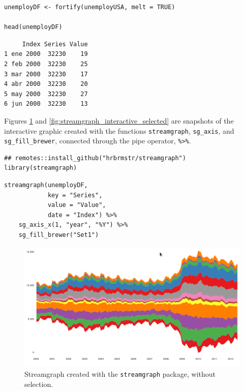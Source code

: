 \documentclass[smallroyalvopaper]{memoir}
\begin{document}

\lstset{language=r,label= ,caption= ,captionpos=b,numbers=none}
\begin{lstlisting}
unemployDF <- fortify(unemployUSA, melt = TRUE)

head(unemployDF)
\end{lstlisting}

\begin{verbatim}
     Index Series Value
1 ene 2000  32230    19
2 feb 2000  32230    25
3 mar 2000  32230    17
4 abr 2000  32230    20
5 may 2000  32230    27
6 jun 2000  32230    13
\end{verbatim}

Figures \ref{fig:streamgraph_interactive} and
\ref{fig:streamgraph_interactive_selected} are snapshots of the
interactive graphic created with the functions \texttt{streamgraph},
\texttt{sg\_axis}, and \texttt{sg\_fill\_brewer}, connected through the pipe operator,
\texttt{\%>\%}.


\lstset{language=r,label= ,caption= ,captionpos=b,numbers=none}
\begin{lstlisting}
## remotes::install_github("hrbrmstr/streamgraph")
library(streamgraph)
\end{lstlisting}

\lstset{language=r,label= ,caption= ,captionpos=b,numbers=none}
\begin{lstlisting}
streamgraph(unemployDF,
            key = "Series",
            value = "Value",
            date = "Index") %>%
    sg_axis_x(1, "year", "%Y") %>%
    sg_fill_brewer("Set1")
\end{lstlisting}

\begin{figure}[htbp]
\centering
\includegraphics[width=.9\linewidth]{figs/streamgraph_interactive.png}
\caption{Streamgraph created with the \texttt{streamgraph} package, without selection. \label{fig:streamgraph_interactive}}
\end{figure}
\end{document}
